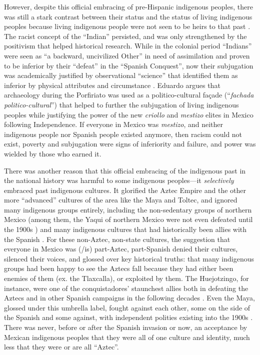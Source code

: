 However, despite this official embracing of pre-Hispanic indigenous peoples, there was still a stark contrast between their status and the status of living indigenous peoples because living indigenous people were not seen to be heirs to that past \parencite[337-338]{Caballero2008}. 
The racist concept of the “Indian” persisted, and was only strengthened by the positivism that helped historical research. 
While in the colonial period “Indians” were seen as “a backward, uncivilized Other” in need of assimilation \parencite[63]{Swarthout2004} and proven to be inferior by their “defeat” in the “Spanish Conquest”, now their subjugation was academically justified by observational “science” that identified them as inferior by physical attributes and circumstance \parencites[70]{Patterson1995}[64]{Swarthout2004}. 
Eduardo \textcite[12,14]{Matos1979} argues that archaeology during the Porfiriato was used as a politico-cultural façade 
(“\emph{fachada politico-cultural}”) that helped to further the subjugation of living indigenous peoples while justifying the power of the new \textit{criollo} and \textit{mestizo} elites in Mexico following Independence. If everyone in Mexico was \textit{mestizo}, and neither indigenous people nor Spanish people existed anymore, then racism could not exist, poverty and subjugation were signs of inferiority and failure, and power was wielded by those who earned it.

There was another reason that this official embracing of the indigenous past in the national history was harmful to some indigenous peoples—it \textit{selectively} embraced past indigenous cultures. 
It glorified the Aztec Empire and the other more “advanced” cultures of the area like the Maya and Toltec, and ignored many indigenous groups entirely, including the non-sedentary groups of northern Mexico (among them, the Yaqui of northern Mexico were not even defeated until the 1900s \parencite[72]{Restall2003}) 
and many indigenous cultures that had historically been allies with the Spanish \parencite[42]{Bueno2016}. 
For these non-Aztec, non-state cultures, the suggestion that everyone in Mexico was (/is) part-Aztec, part-Spanish denied their cultures, silenced their voices, and glossed over key historical truths: that many indigenous groups had been happy to see the Aztecs fall because they had either been enemies of them (ex. the Tlaxcalla), or exploited by them. The Huejotzingo, for instance, were one of the conquistadores’ staunchest allies both in defeating the Aztecs and in other Spanish campaigns in the following decades \parencite[49]{Restall2003}. 
Even the Maya, glossed under this umbrella label, fought against each other, some on the side of the Spanish and some against, with independent polities existing into the 1900s \parencite[50,72]{Restall2003}. 
There was never, before or after the Spanish invasion or now, an acceptance by Mexican indigenous peoples that they were all of one culture and identity, much less that they were or are all “Aztec”. 

